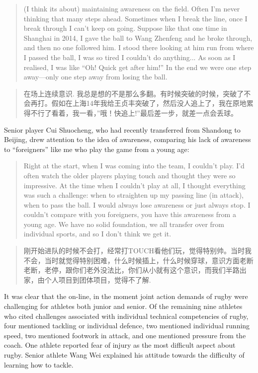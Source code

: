 \begin{CJK}{UTF8}{gbsn}
  \begin{quote}
    (I think its about) maintaining awareness on the field. Often I'm never thinking that many steps ahead.  Sometimes when I break the line, once I break through I can't keep on going.  Suppose like that one time in Shanghai in 2014, I gave the ball to Wang Zhenfeng and he broke through, and then no one followed him.  I stood there looking at him run from where I passed the ball, I was so tired I couldn't do anything... As soon as I realised, I was like ``Oh! Quick get after him!'' In the end we were one step away---only one step away from losing the ball.
  \end{quote}

  \begin{quote}
    在场上连续意识. 我总是想的不是那么多翻。有时候突破的时候，突破了不会再打。假如在上海14年我给王贞丰突破了，然后没人追上了，我在原地累得不行了看着，我一看，''哦！快追上!''最后差一步，就差一点会丢球。
  \end{quote}

Senior player Cui Shuocheng, who had recently transferred from Shandong to Beijing, drew attention to the idea of awareness, comparing his lack of awareness to ``foreigners'' like me who play the game from a young age:

    \begin{quote}
      Right at the start, when I was coming into the team, I couldn't play. I'd often watch the older players playing touch and thought they were so impressive.  At the time when I couldn't play at all, I thought everything was such a challenge: when to straighten up my passing line (in attack), when to pass the ball.  I would always lose awareness or just always stop. I couldn't compare with you foreigners, you have this awareness from a young age.  We have no solid foundation, we all transfer over from individual sports, and so I don't think we get it.
    \end{quote}

    \begin{quote}
      刚开始进队的时候不会打，经常打TOUCH看他们玩，觉得特别帅。当时我不会，当时就觉得特别困难，什么时候插上，什么时候穿球，意识方面老断老断，老停，跟你们老外没法比，你们从小就有这个意识，而我们半路出家，由个人项目到团体项目，觉得不了解.
    \end{quote}

It was clear that the on-line, in the moment joint action demands of rugby were challenging for athletes both junior and senior.  Of the remaining nine athletes who cited challenges associated with individual technical competencies of rugby, four mentioned tackling or individual defence, two mentioned individual running speed, two mentioned footwork in attack, and one mentioned pressure from the coach. One athlete reported fear of injury as the most difficult aspect about rugby.   Senior athlete Wang Wei explained his attitude towards the difficulty of learning how to tackle.


\end{CJK}
